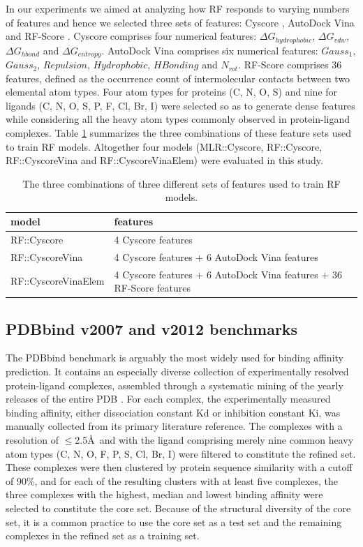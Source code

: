 In our experiments we aimed at analyzing how RF responds to varying numbers of features and hence we selected three sets of features: Cyscore \citep{1372}, AutoDock Vina \citep{595} and RF-Score \citep{564}. Cyscore comprises four numerical features: $\Delta G_{hydrophobic}$, $\Delta G_{vdw}$, $\Delta G_{hbond}$ and $\Delta G_{entropy}$. AutoDock Vina comprises six numerical features: $Gauss_1$, $Gauss_2$, $Repulsion$, $Hydrophobic$, $HBonding$ and $N_{rot}$. RF-Score comprises 36 features, defined as the occurrence count of intermolecular contacts between two elemental atom types. Four atom types for proteins (C, N, O, S) and nine for ligands (C, N, O, S, P, F, Cl, Br, I) were selected so as to generate dense features while considering all the heavy atom types commonly observed in protein-ligand complexes. Table \ref{rfcyscore:features} summarizes the three combinations of these feature sets used to train RF models. Altogether four models (MLR::Cyscore, RF::Cyscore, RF::CyscoreVina and RF::CyscoreVinaElem) were evaluated in this study.

\begin{table}
\caption{The three combinations of three different sets of features used to train RF models.}
\label{rfcyscore:features}
\begin{tabular}{ll}
\hline
model & features\\
\hline
RF::Cyscore         & 4 Cyscore features\\
RF::CyscoreVina     & 4 Cyscore features + 6 AutoDock Vina features\\
RF::CyscoreVinaElem & 4 Cyscore features + 6 AutoDock Vina features + 36 RF-Score features\\
\hline
\end{tabular}
\end{table}

\subsection{PDBbind v2007 and v2012 benchmarks}

The PDBbind \citep{529,530} benchmark is arguably the most widely used for binding affinity prediction. It contains an especially diverse collection of experimentally resolved protein-ligand complexes, assembled through a systematic mining of the yearly releases of the entire PDB \citep{540,537}. For each complex, the experimentally measured binding affinity, either dissociation constant Kd or inhibition constant Ki, was manually collected from its primary literature reference. The complexes with a resolution of $\le$2.5\AA\ and with the ligand comprising merely nine common heavy atom types (C, N, O, F, P, S, Cl, Br, I) were filtered to constitute the refined set. These complexes were then clustered by protein sequence similarity with a cutoff of 90\%, and for each of the resulting clusters with at least five complexes, the three complexes with the highest, median and lowest binding affinity were selected to constitute the core set. Because of the structural diversity of the core set, it is a common practice to use the core set as a test set and the remaining complexes in the refined set as a training set.

